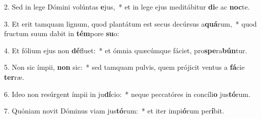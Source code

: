 2. Sed in lege Dómini volúntas \textbf{e}jus,~*  et in lege ejus meditábitur \textbf{di}e ac \textbf{noc}te.\

3. Et erit tamquam lignum, quod plantátum est secus decúrsus a\textbf{quá}rum,~*  quod fructum suum dabit in \textbf{tém}pore \textbf{su}o:\

4. Et fólium ejus non \textbf{dé}fluet:~*  et ómnia quæcúmque fáciet, pro\textbf{spe}ra\textbf{bún}tur.\

5. Non sic ímpii, \textbf{non} sic:~*  sed tamquam pulvis, quem prójicit ventus a \textbf{fá}cie \textbf{ter}ræ.\

6. Ideo non resúrgent ímpii in ju\textbf{dí}cio:~*  neque peccatóres in concíli\textbf{o} jus\textbf{tó}rum.\

7. Quóniam novit Dóminus viam jus\textbf{tó}rum:~*  et iter impi\textbf{ó}rum per\textbf{í}bit.\

